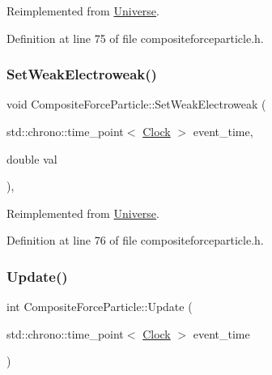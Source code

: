 Reimplemented from \hyperlink{class_universe_a0f5cd04081b41ee931c0557dc397f6fb}{Universe}.



Definition at line 75 of file compositeforceparticle.\+h.

\mbox{\label{class_composite_force_particle_a73a3792ae1c334e74f945fea56083f0b}} 
\subsubsection{\texorpdfstring{Set\+Weak\+Electroweak()}{SetWeakElectroweak()}}
{\footnotesize\ttfamily void Composite\+Force\+Particle\+::\+Set\+Weak\+Electroweak (\begin{DoxyParamCaption}\item[{std\+::chrono\+::time\+\_\+point$<$ \hyperlink{universe_8h_a0ef8d951d1ca5ab3cfaf7ab4c7a6fd80}{Clock} $>$}]{event\+\_\+time,  }\item[{double}]{val }\end{DoxyParamCaption})\hspace{0.3cm}{\ttfamily [inline]}, {\ttfamily [virtual]}}



Reimplemented from \hyperlink{class_universe_a2d3d642bfdc863248e93535832fa4b00}{Universe}.



Definition at line 76 of file compositeforceparticle.\+h.

\mbox{\label{class_composite_force_particle_a69b47aaf17ab6faa396c2f6e6c85b2e3}} 
\subsubsection{\texorpdfstring{Update()}{Update()}}
{\footnotesize\ttfamily int Composite\+Force\+Particle\+::\+Update (\begin{DoxyParamCaption}\item[{std\+::chrono\+::time\+\_\+point$<$ \hyperlink{universe_8h_a0ef8d951d1ca5ab3cfaf7ab4c7a6fd80}{Clock} $>$}]{event\+\_\+time }\end{DoxyParamCaption})}



